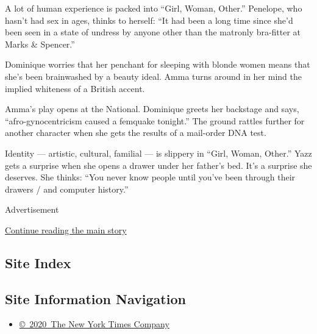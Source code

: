 A lot of human experience is packed into ``Girl, Woman, Other.''
Penelope, who hasn't had sex in ages, thinks to herself: ``It had been a
long time since she'd been seen in a state of undress by anyone other
than the matronly bra-fitter at Marks \& Spencer.''

Dominique worries that her penchant for sleeping with blonde women means
that she's been brainwashed by a beauty ideal. Amma turns around in her
mind the implied whiteness of a British accent.

Amma's play opens at the National. Dominique greets her backstage and
says, ``afro-gynocentricism caused a femquake tonight.'' The ground
rattles further for another character when she gets the results of a
mail-order DNA test.

Identity --- artistic, cultural, familial --- is slippery in ``Girl,
Woman, Other.'' Yazz gets a surprise when she opens a drawer under her
father's bed. It's a surprise she deserves. She thinks: ``You never know
people until you've been through their drawers / and computer history.''

Advertisement

\protect\hyperlink{after-bottom}{Continue reading the main story}

\hypertarget{site-index}{%
\subsection{Site Index}\label{site-index}}

\hypertarget{site-information-navigation}{%
\subsection{Site Information
Navigation}\label{site-information-navigation}}

\begin{itemize}
\tightlist
\item
  \href{https://help.nytimes3xbfgragh.onion/hc/en-us/articles/115014792127-Copyright-notice}{©~2020~The
  New York Times Company}
\end{itemize}

